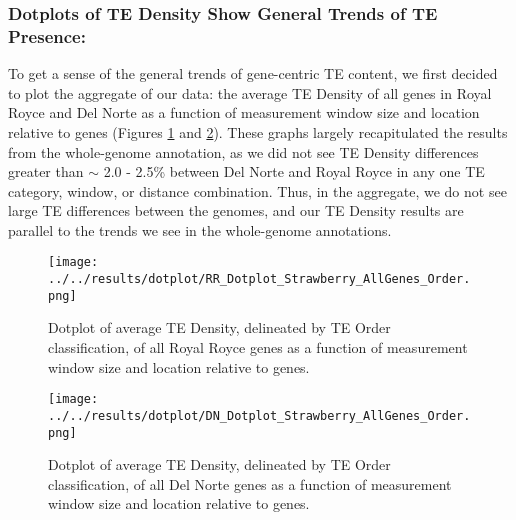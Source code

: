 \documentclass[fleqn,10pt]{olplainarticle}
\begin{document}
\subsubsection{Dotplots of TE Density Show General Trends of TE Presence:}
To get a sense of the general trends of gene-centric TE content, we first decided to plot the aggregate of our data: the average TE Density of all genes in Royal Royce and Del Norte as a function of measurement window size and location relative to genes (Figures \ref{fig:RR_order_dotplot} and \ref{fig:DN_order_dotplot}).
These graphs largely recapitulated the results from the whole-genome annotation, as we did not see TE Density differences greater than $\sim$ 2.0 - 2.5\% between Del Norte and Royal Royce in any one TE category, window, or distance combination.
Thus, in the aggregate, we do not see large TE differences between the genomes, and our TE Density results are parallel to the trends we see in the whole-genome annotations.


\begin{figure}[ht]
\centering
\texttt{[image: ../../results/dotplot/RR\_Dotplot\_Strawberry\_AllGenes\_Order.png]}
\caption{Dotplot of average TE Density, delineated by TE Order classification, of all Royal Royce genes as a function of measurement window size and location relative to genes.}
\label{fig:RR_order_dotplot}
\end{figure}

\begin{figure}[ht]
\centering
\texttt{[image: ../../results/dotplot/DN\_Dotplot\_Strawberry\_AllGenes\_Order.png]}
\caption{Dotplot of average TE Density, delineated by TE Order classification, of all Del Norte genes as a function of measurement window size and location relative to genes.}
\label{fig:DN_order_dotplot}
\end{figure}

\end{document}
